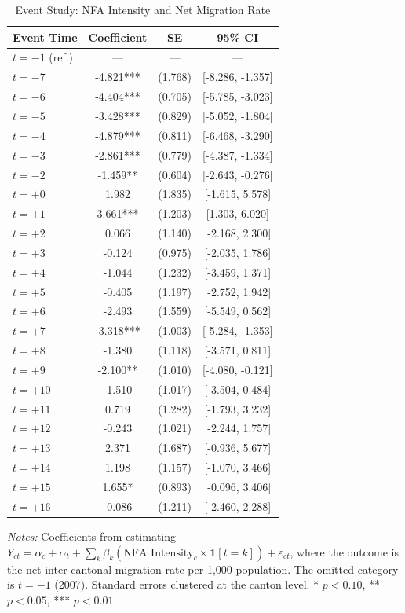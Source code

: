 \begin{table}[H]
\centering
\caption{Event Study: NFA Intensity and Net Migration Rate}
\begin{threeparttable}
\begin{tabular}{lccc}
\toprule
Event Time & Coefficient & SE & 95\% CI \\
\midrule
$t = -1$ (ref.) & --- & --- & --- \\
$t = -7$ & -4.821*** & (1.768) & [-8.286, -1.357] \\
$t = -6$ & -4.404*** & (0.705) & [-5.785, -3.023] \\
$t = -5$ & -3.428*** & (0.829) & [-5.052, -1.804] \\
$t = -4$ & -4.879*** & (0.811) & [-6.468, -3.290] \\
$t = -3$ & -2.861*** & (0.779) & [-4.387, -1.334] \\
$t = -2$ & -1.459** & (0.604) & [-2.643, -0.276] \\
$t = +0$ & 1.982 & (1.835) & [-1.615, 5.578] \\
$t = +1$ & 3.661*** & (1.203) & [1.303, 6.020] \\
$t = +2$ & 0.066 & (1.140) & [-2.168, 2.300] \\
$t = +3$ & -0.124 & (0.975) & [-2.035, 1.786] \\
$t = +4$ & -1.044 & (1.232) & [-3.459, 1.371] \\
$t = +5$ & -0.405 & (1.197) & [-2.752, 1.942] \\
$t = +6$ & -2.493 & (1.559) & [-5.549, 0.562] \\
$t = +7$ & -3.318*** & (1.003) & [-5.284, -1.353] \\
$t = +8$ & -1.380 & (1.118) & [-3.571, 0.811] \\
$t = +9$ & -2.100** & (1.010) & [-4.080, -0.121] \\
$t = +10$ & -1.510 & (1.017) & [-3.504, 0.484] \\
$t = +11$ & 0.719 & (1.282) & [-1.793, 3.232] \\
$t = +12$ & -0.243 & (1.021) & [-2.244, 1.757] \\
$t = +13$ & 2.371 & (1.687) & [-0.936, 5.677] \\
$t = +14$ & 1.198 & (1.157) & [-1.070, 3.466] \\
$t = +15$ & 1.655* & (0.893) & [-0.096, 3.406] \\
$t = +16$ & -0.086 & (1.211) & [-2.460, 2.288] \\
\bottomrule
\end{tabular}
\begin{tablenotes}[flushleft]
\small
\item \textit{Notes:} Coefficients from estimating $Y_{ct} = \alpha_c + \alpha_t + \sum_k \beta_k (\text{NFA Intensity}_c \times \mathbf{1}[t = k]) + \varepsilon_{ct}$, where the outcome is the net inter-cantonal migration rate per 1,000 population. The omitted category is $t = -1$ (2007). Standard errors clustered at the canton level. * $p<0.10$, ** $p<0.05$, *** $p<0.01$.
\end{tablenotes}
\end{threeparttable}
\label{tab:eventstudy}
\end{table}

